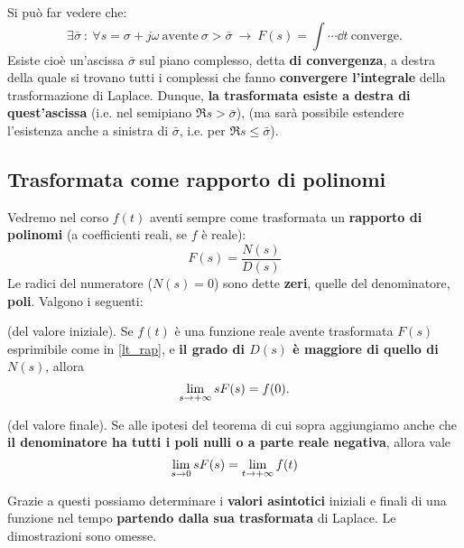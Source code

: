 \begin{prop}
Si può far vedere che:
\begin{equation}
	\exists \bar \sigma \ : \ \forall s = \sigma + j \omega \ \textrm{avente} \ \sigma > \bar \sigma \ \longrightarrow \ F(s) = \int \cdots \dd{t} \ \textrm{converge}.
\end{equation}
Esiste cioè un'ascissa $\bar \sigma$ sul piano complesso, detta \textbf{di convergenza}, a destra della quale si trovano tutti i complessi che fanno \textbf{convergere l'integrale} della trasformazione di Laplace. Dunque, \textbf{la trasformata esiste a destra di quest'ascissa} (i.e. nel semipiano $\Re{s} > \bar \sigma$), (ma sarà possibile estendere l'esistenza anche a sinistra di $\bar \sigma$, i.e. per $\Re{s} \leq \bar \sigma$).
\end{prop}

\subsection{Trasformata come rapporto di polinomi}
Vedremo nel corso $f(t)$ aventi sempre come trasformata un \textbf{rapporto di polinomi} (a coefficienti reali, se $f$ è reale):
\begin{equation}
\label{lt_rap}
	F(s) = \frac{N(s)}{D(s)}
\end{equation} 
Le radici del numeratore ($N(s) = 0$) sono dette \textbf{zeri}, quelle del denominatore, \textbf{poli}. Valgono i seguenti:
\begin{them}
(del valore iniziale). Se $f(t)$ è una funzione reale avente trasformata $F(s)$ esprimibile come in \eqref{lt_rap}, e \textbf{il grado di $D(s)$ è maggiore di quello di $N(s)$}, allora
\begin{equation}
\lim_{s \rightarrow +\infty} sF(s) = f(0).
\end{equation}
\end{them}

\begin{them} (del valore finale). Se alle ipotesi del teorema di cui sopra aggiungiamo anche che \textbf{il denominatore ha tutti i poli nulli o a parte reale negativa}, allora vale
\begin{equation}
\lim_{s \rightarrow 0} sF(s) = \lim_{t \rightarrow +\infty} f(t)
\end{equation} 
\end{them}
Grazie a questi possiamo determinare i \textbf{valori asintotici }iniziali e finali di una funzione nel tempo \textbf{partendo dalla sua trasformata} di Laplace. Le dimostrazioni sono omesse.

